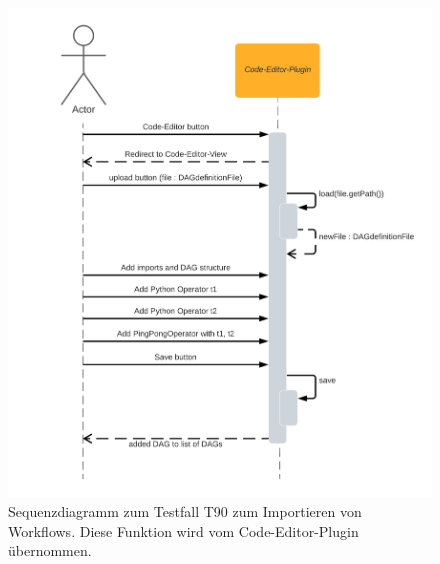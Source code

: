\begin{figure}[ht]
    \centering
    \includegraphics[width=\textwidth]{Diagramme/Sequenzdiagramm T9.png}
    \caption{Sequenzdiagramm zum Testfall T90 zum Importieren von Workflows. Diese Funktion wird vom Code-Editor-Plugin übernommen.}
    \label{fig:SQD_T90}
\end{figure}

